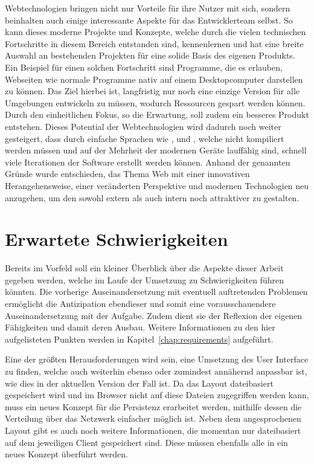 Webtechnologien bringen nicht nur Vorteile für ihre Nutzer mit sich, sondern beinhalten auch einige interessante Aspekte für das Entwicklerteam selbst. So kann dieses moderne Projekte und Konzepte, welche durch die vielen technischen Fortschritte in diesem Bereich entstanden sind, kennenlernen und hat eine breite Auswahl an bestehenden Projekten für eine solide Basis des eigenen Produkts. Ein Beispiel für einen solchen Fortschritt sind Programme, die es erlauben, Webseiten wie normale Programme nativ auf einem Desktopcomputer darstellen zu können. Das Ziel hierbei ist, langfristig nur noch eine einzige Version für alle Umgebungen entwickeln zu müssen, wodurch Ressourcen gespart werden können. Durch den einheitlichen Fokus, so die Erwartung, soll zudem ein besseres Produkt entstehen. Dieses Potential der Webtechnologien wird dadurch noch weiter gesteigert, dass durch einfache Sprachen wie ,  und , welche nicht kompiliert werden müssen und auf der Mehrheit der modernen Geräte lauffähig sind, schnell viele Iterationen der Software erstellt werden können.
Anhand der genannten Gründe wurde entschieden, das Thema Web mit einer innovativen Herangehensweise, einer veränderten Perspektive und modernen Technologien neu anzugehen, um den  sowohl extern als auch intern noch attraktiver zu gestalten.

\section{Erwartete Schwierigkeiten}
Bereits im Vorfeld soll ein kleiner Überblick über die Aspekte dieser Arbeit gegeben werden, welche im Laufe der Umsetzung zu Schwierigkeiten führen könnten. Die vorherige Auseinandersetzung mit eventuell auftretenden Problemen ermöglicht die Antizipation ebendieser und somit eine vorausschauendere Auseinandersetzung mit der Aufgabe. Zudem dient sie der Reflexion der eigenen Fähigkeiten und damit deren Ausbau. Weitere Informationen zu den hier aufgelisteten Punkten werden in Kapitel~\ref{chap:requirements} aufgeführt.

Eine der größten Herausforderungen wird sein, eine Umsetzung des User Interface zu finden, welche auch weiterhin ebenso oder zumindest annähernd anpassbar ist, wie dies in der aktuellen Version der Fall ist. Da das Layout dateibasiert gespeichert wird und im Browser nicht auf diese Dateien zugegriffen werden kann, muss ein neues Konzept für die Persistenz erarbeitet werden, mithilfe dessen die Verteilung über das Netzwerk einfacher möglich ist. 
Neben dem angesprochenen Layout gibt es auch noch weitere Informationen, die momentan nur dateibasiert auf dem jeweiligen Client gespeichert sind. Diese müssen ebenfalls alle in ein neues Konzept überführt werden.

